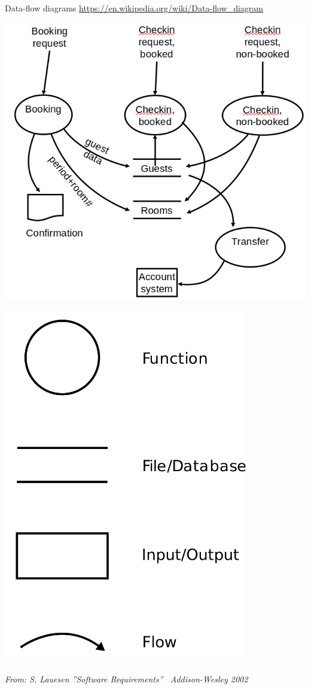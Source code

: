 \begin{Slide}{Data-flow diagrams}
\footnotesize\url{https://en.wikipedia.org/wiki/Data-flow_diagram}

\begin{minipage}[t]{0.6\textwidth}
\vspace{-0.4em}\includegraphics[width=1.0\textwidth]{../img/data-flow-diagram}
\vspace{-1.4em}
\end{minipage}%
\hfill\begin{minipage}[t]{0.3\textwidth}
\vspace{-0.1em}\includegraphics[width=0.8\textwidth]{../img/data-flow-diagram-symbols}
\end{minipage}%

{\vspace*{1em}\fontsize{5}{5}\itshape\selectfont From: S. Lauesen ''Software Requirements'' \textcopyright~Addison-Wesley 2002}
\end{Slide}
